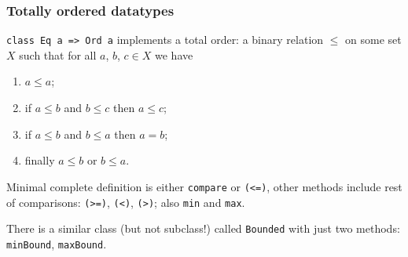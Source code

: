 %

\subsubsection{Totally ordered datatypes}
\texttt{class Eq a => Ord a} implements a total order: a binary relation $\le$ on some set $X$ such that for all $a$, $b$, $c \in X$ we have
\begin{enumerate}
    \item $a \le a$;
    \item if $a \le b$ and $b \le c$ then $a \le c$;
    \item if $a \le b$ and $b \le a$ then $a = b$;
    \item finally $a \le b$ or $b \le a$.
\end{enumerate}

Minimal complete definition is either \texttt{compare} or \texttt{(<=)}, other methods include rest of comparisons: \texttt{(>=)}, \texttt{(<)}, \texttt{(>)}; also \texttt{min} and \texttt{max}.

There is a similar class (but not subclass!) called \texttt{Bounded} with just two methods: \texttt{minBound}, \texttt{maxBound}.

%